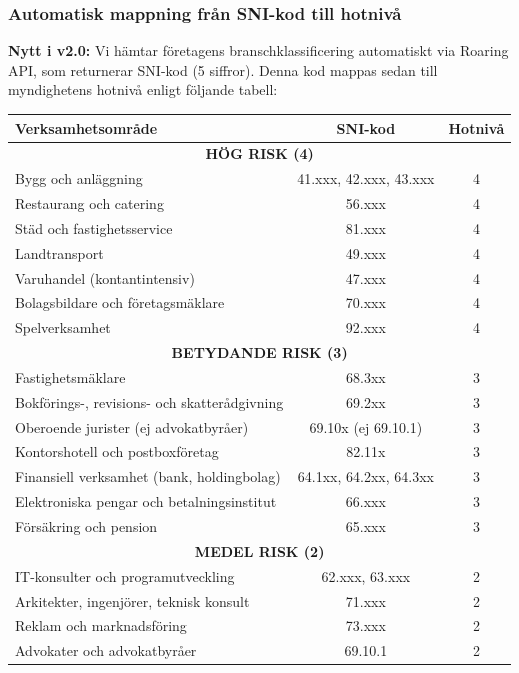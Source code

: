 \documentclass{article}
\begin{document}
\subsubsection*{Automatisk mappning från SNI-kod till hotnivå}

\textbf{Nytt i v2.0:} Vi hämtar företagens branschklassificering automatiskt via Roaring API, som returnerar SNI-kod (5 siffror). Denna kod mappas sedan till myndighetens hotnivå enligt följande tabell:

\begin{center}
\small
\begin{tabular}{|p{7cm}|c|c|}
\hline
\textbf{Verksamhetsområde} & \textbf{SNI-kod} & \textbf{Hotnivå} \\
\hline
\multicolumn{3}{|c|}{\textbf{HÖG RISK (4)}} \\
\hline
Bygg och anläggning & 41.xxx, 42.xxx, 43.xxx & 4 \\
Restaurang och catering & 56.xxx & 4 \\
Städ och fastighetsservice & 81.xxx & 4 \\
Landtransport & 49.xxx & 4 \\
Varuhandel (kontantintensiv) & 47.xxx & 4 \\
Bolagsbildare och företagsmäklare & 70.xxx & 4 \\
Spelverksamhet & 92.xxx & 4 \\
\hline
\multicolumn{3}{|c|}{\textbf{BETYDANDE RISK (3)}} \\
\hline
Fastighetsmäklare & 68.3xx & 3 \\
Bokförings-, revisions- och skatterådgivning & 69.2xx & 3 \\
Oberoende jurister (ej advokatbyråer) & 69.10x (ej 69.10.1) & 3 \\
Kontorshotell och postboxföretag & 82.11x & 3 \\
Finansiell verksamhet (bank, holdingbolag) & 64.1xx, 64.2xx, 64.3xx & 3 \\
Elektroniska pengar och betalningsinstitut & 66.xxx & 3 \\
Försäkring och pension & 65.xxx & 3 \\
\hline
\multicolumn{3}{|c|}{\textbf{MEDEL RISK (2)}} \\
\hline
IT-konsulter och programutveckling & 62.xxx, 63.xxx & 2 \\
Arkitekter, ingenjörer, teknisk konsult & 71.xxx & 2 \\
Reklam och marknadsföring & 73.xxx & 2 \\
Advokater och advokatbyråer & 69.10.1 & 2 \\

\end{tabular}
\end{center}
\end{document}

